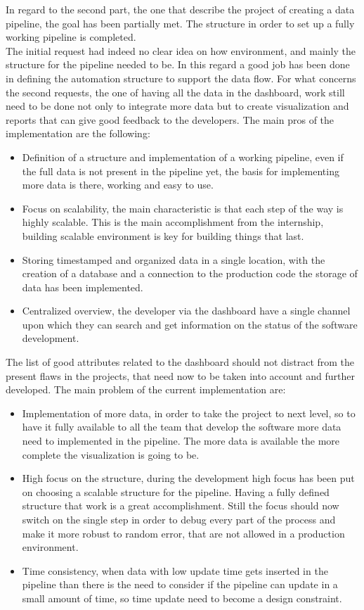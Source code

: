 \documentclass[../main.tex]{subfiles}
\begin{document}
In regard to the second part, the one that describe the project of creating a data pipeline, the goal has been partially met. The structure in order to set up a fully working pipeline is completed.\\
The initial request had indeed no clear idea on how environment, and mainly the structure for the pipeline needed to be. In this regard a good job has been done in defining the automation structure to support the data flow. For what concerns the second requests, the one of having all the data in the dashboard, work still need to be done not only to integrate more data but to create visualization and reports that can give good feedback to the developers.
The main pros of the implementation are the following:
\begin{itemize}
    \item Definition of a structure and implementation of a working pipeline, even if the full data is not present in the pipeline yet, the basis for implementing more data is there, working and easy to use. 
    \item Focus on scalability, the main characteristic is that each step of the way is highly scalable. This is the main accomplishment from the internship, building scalable environment is key for building things that last.
    \item Storing timestamped and organized data in a single location, with the creation of a database and a connection to the production code the storage of data has been implemented. 
    \item Centralized overview, the developer via the dashboard have a single channel upon which they can search and get information on the status of the software development. 
\end{itemize}
The list of good attributes related to the dashboard should not distract from the present flaws in the projects, that need now to be taken into account and further developed. The main problem of the current implementation are:
\begin{itemize}
    \item Implementation of more data, in order to take the project to next level, so to have it fully available to all the team that develop the software more data need to implemented in the pipeline. The more data is available the more complete the visualization is going to be.
    \item High focus on the structure, during the development high focus has been put on choosing a scalable structure for the pipeline. Having a fully defined structure that work is a great accomplishment. Still the focus should now switch on the single step in order to debug every part of the process and make it more robust to random error, that are not allowed in a production environment.
    \item Time consistency, when data with low update time gets inserted in the pipeline than there is the need to consider if the pipeline can update in a small amount of time, so time update need to become a design constraint. 
\end{itemize}
\end{document}
